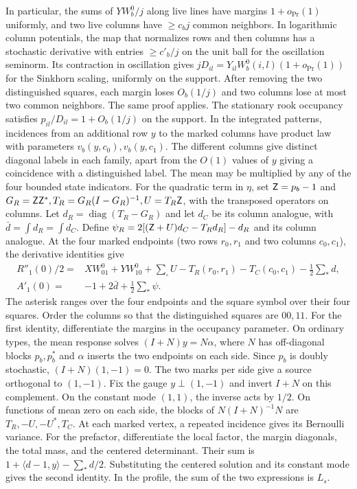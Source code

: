 In particular, the sums of \(YW_b^0/j\) along live lines have margins \(1+o_{\Pr}(1)\) uniformly, and two
live columns have \(\ge c_bj\) common neighbors. In logarithmic column potentials, the map that
normalizes rows and then columns has a stochastic derivative with entries \(\ge c'_b/j\) on the unit ball
for the oscillation seminorm. Its contraction in oscillation gives
\(jD_{il}=Y_{il}W_b^0(i,l)(1+o_{\Pr}(1))\) for the Sinkhorn scaling, uniformly on the support. After
removing the two distinguished squares, each margin loses \(O_b(1/j)\) and two columns lose at most two
common neighbors. The same proof applies. The stationary rook occupancy satisfies
\(p_{il}/D_{il}=1+O_b(1/j)\) on the support. In the integrated patterns, incidences from an additional
row \(y\) to the marked columns have product law with parameters \(v_b(y,c_0),v_b(y,c_1)\). The different
columns give distinct diagonal labels in each family, apart from the \(O(1)\) values of \(y\) giving a
coincidence with a distinguished label. The mean may be multiplied by any of the four bounded state
indicators. For the quadratic term in \(\eta\), set \(\mathsf Z=p_b-1\) and \(G_R=\mathsf Z\mathsf Z^*,
T_R=G_R(I-G_R)^{-1}, U=T_R\mathsf Z\), with the transposed operators on columns. Let
\(d_R=\operatorname{diag}(T_R-G_R)\) and let \(d_C\) be its column analogue, with \(\bar d=\int d_R=\int
d_C\). Define \(\psi_R=2[(\mathsf Z+U)d_C-T_Rd_R]-d_R\) and its column analogue. At the four marked
endpoints (two rows \(r_0,r_1\) and two columns \(c_0,c_1\)), the derivative identities give
\begin{align*}
 R''_1(0)/2={}&XW^0_{01}+YW^0_{10}+\sum_{\square} U-T_R(r_0,r_1)-T_C(c_0,c_1)
              -\tfrac12\sum_* d,\\
 A'_1(0)={}&-1+2\bar d+\tfrac12\sum_* \psi .
\end{align*} The asterisk ranges over the four endpoints and the square symbol over their four squares.
Order the columns so that the distinguished squares are \(00,11\). For the first identity, differentiate
the margins in the occupancy parameter. On ordinary types, the mean response solves \((I+N)y=N\alpha\),
where \(N\) has off-diagonal blocks \(p_b,p_b^*\) and \(\alpha\) inserts the two endpoints on each side.
Since \(p_b\) is doubly stochastic, \((I+N)(1,-1)=0\). The two marks per side give a source orthogonal to
\((1,-1)\). Fix the gauge \(y\perp(1,-1)\) and invert \(I+N\) on this complement. On the constant mode
\((1,1)\), the inverse acts by \(1/2\). On functions of mean zero on each side, the blocks of
\(N(I+N)^{-1}N\) are \(T_R,-U,-U^*,T_C\). At each marked vertex, a repeated incidence gives its Bernoulli
variance. For the prefactor, differentiate the local factor, the margin diagonals, the total mass, and
the centered determinant. Their sum is \(1+\langle d-1,y\rangle-\sum_*d/2\). Substituting the centered
solution and its constant mode gives the second identity. In the profile, the sum of the two expressions
is \(L_s\).

